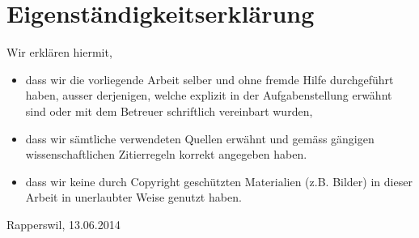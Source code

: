 \section{Eigenständigkeitserklärung}
Wir erklären hiermit, 
\begin{itemize}


\item	dass wir die vorliegende Arbeit selber und ohne fremde Hilfe durchgeführt haben, ausser derjenigen, welche explizit in der Aufgabenstellung erwähnt sind oder mit dem Betreuer schriftlich vereinbart wurden,
\item	dass wir sämtliche verwendeten Quellen erwähnt und gemäss gängigen wissenschaftlichen Zitierregeln korrekt angegeben haben.
\item dass wir keine durch Copyright geschützten Materialien (z.B. Bilder) in dieser Arbeit in unerlaubter Weise genutzt haben. 

\end{itemize}

Rapperswil, 13.06.2014


